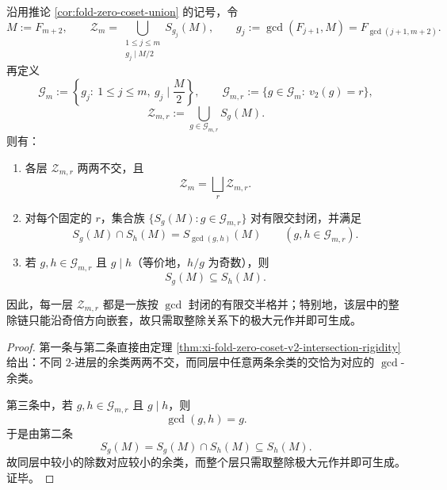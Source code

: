 \begin{corollary}\label{cor:xi-fold-zero-set-v2-semilattice-decomposition}
沿用推论 \ref{cor:fold-zero-coset-union} 的记号，令
\[
M:=F_{m+2},
\qquad
\mathcal Z_m
=
\bigcup_{\substack{1\le j\le m\\ g_j\mid M/2}}S_{g_j}(M),
\qquad
g_j:=\gcd(F_{j+1},M)=F_{\gcd(j+1,m+2)}.
\]
再定义
\[
\mathcal G_m:=\left\{g_j:\ 1\le j\le m,\ g_j\mid \frac{M}{2}\right\},
\qquad
\mathcal G_{m,r}:=\{g\in\mathcal G_m:\ v_2(g)=r\},
\]
\[
\mathcal Z_{m,r}:=\bigcup_{g\in\mathcal G_{m,r}}S_g(M).
\]
则有：
\begin{enumerate}
  \item 各层 \(\mathcal Z_{m,r}\) 两两不交，且
  \[
  \boxed{\;
  \mathcal Z_m=\bigsqcup_r \mathcal Z_{m,r}.\;}
  \]
  \item 对每个固定的 \(r\)，集合族 \(\{S_g(M): g\in \mathcal G_{m,r}\}\) 对有限交封闭，并满足
  \[
  \boxed{\;
  S_g(M)\cap S_h(M)=S_{\gcd(g,h)}(M)
  \qquad (g,h\in \mathcal G_{m,r}).\;}
  \]
  \item 若 \(g,h\in \mathcal G_{m,r}\) 且 \(g\mid h\)（等价地，\(h/g\) 为奇数），则
  \[
  \boxed{\;
  S_g(M)\subseteq S_h(M).\;}
  \]
\end{enumerate}
因此，每一层 \(\mathcal Z_{m,r}\) 都是一族按 \(\gcd\) 封闭的有限交半格并；特别地，该层中的整除链只能沿奇倍方向嵌套，故只需取整除关系下的极大元作并即可生成。
\end{corollary}
\begin{proof}
第一条与第二条直接由定理 \ref{thm:xi-fold-zero-coset-v2-intersection-rigidity} 给出：不同 \(2\)-进层的余类两两不交，而同层中任意两条余类的交恰为对应的 \(\gcd\)-余类。

第三条中，若 \(g,h\in\mathcal G_{m,r}\) 且 \(g\mid h\)，则
\[
\gcd(g,h)=g.
\]
于是由第二条
\[
S_g(M)
=
S_g(M)\cap S_h(M)
\subseteq
S_h(M).
\]
故同层中较小的除数对应较小的余类，而整个层只需取整除极大元作并即可生成。证毕。
\end{proof}

